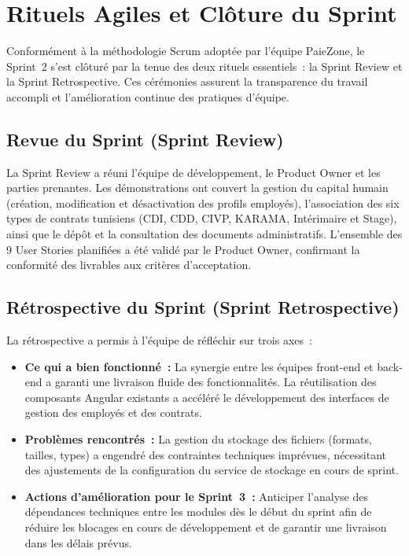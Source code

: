 \section{Rituels Agiles et Clôture du Sprint}
\label{sec:s2-rituels}

Conformément à la méthodologie Scrum adoptée par l'équipe PaieZone,
le Sprint~2 s'est clôturé par la tenue des deux rituels essentiels~:
la Sprint Review et la Sprint Retrospective. Ces cérémonies assurent
la transparence du travail accompli et l'amélioration continue des
pratiques d'équipe.
\subsection{Revue du Sprint (Sprint Review)}

La Sprint Review a réuni l'équipe de développement, le Product Owner
et les parties prenantes. Les démonstrations ont couvert la gestion
du capital humain (création, modification et désactivation des profils
employés), l'association des six types de contrats tunisiens (CDI, CDD,
CIVP, KARAMA, Intérimaire et Stage), ainsi que le dépôt et la
consultation des documents administratifs. L'ensemble des 9 User
Stories planifiées a été validé par le Product Owner, confirmant la
conformité des livrables aux critères d'acceptation.
\subsection{Rétrospective du Sprint (Sprint Retrospective)}

La rétrospective a permis à l'équipe de réfléchir sur trois axes~:

\begin{itemize}[label=\textbullet, leftmargin=0.6cm]
    \item \textbf{Ce qui a bien fonctionné~:} La synergie entre les
          équipes front-end et back-end a garanti une livraison fluide
          des fonctionnalités. La réutilisation des composants Angular
          existants a accéléré le développement des interfaces de
          gestion des employés et des contrats.

    \item \textbf{Problèmes rencontrés~:} La gestion du stockage des
          fichiers (formats, tailles, types) a engendré des contraintes
          techniques imprévues, nécessitant des ajustements de la
          configuration du service de stockage en cours de sprint.

    \item \textbf{Actions d'amélioration pour le Sprint~3~:} Anticiper
          l'analyse des dépendances techniques entre les modules dès
          le début du sprint afin de réduire les blocages en cours de
          développement et de garantir une livraison dans les délais
          prévus.
\end{itemize}
